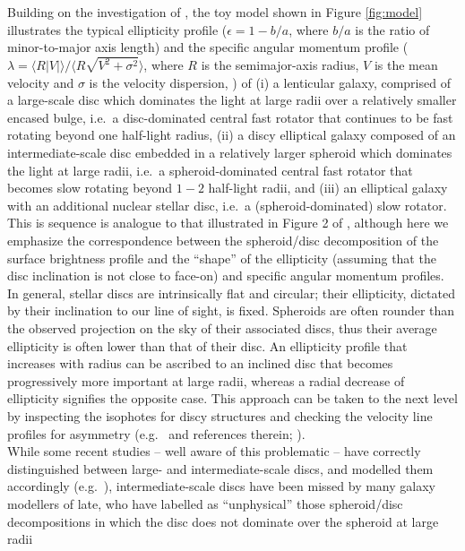 \documentclass[useAMS,usenatbib,article]{mnras}
\begin{document}
{Building on the investigation of \cite{rixwhite1990}, 
the toy model shown in Figure \ref{fig:model} illustrates the typical ellipticity profile 
($\epsilon = 1 - b/a$, where $b/a$ is the ratio of minor-to-major axis length) 
and the specific angular momentum profile 
($\lambda = \langle R |V| \rangle / \langle R \sqrt{V^2 + \sigma^2} \rangle$, 
where $R$ is the semimajor-axis radius, $V$ is the mean velocity and $\sigma$ is the velocity dispersion, \citealt{emsellem2007}) 
of 
(i) a lenticular galaxy, 
comprised of a large-scale disc which dominates the light at large radii over a relatively smaller encased bulge,  
i.e.~a disc-dominated central fast rotator that continues to be fast rotating beyond one half-light radius, 
(ii) a discy elliptical galaxy \citep{kormendybender1996} 
composed of an intermediate-scale disc embedded in a relatively larger spheroid which dominates the light at large radii,
i.e.~a spheroid-dominated central fast rotator that becomes slow rotating beyond $1-2$ half-light radii, and  
(iii) an elliptical galaxy with an additional nuclear stellar disc, 
i.e.~a (spheroid-dominated) slow rotator. 
This is sequence is analogue to that illustrated in Figure 2 of \cite{cappellari2011}, 
although here we emphasize the correspondence between the spheroid/disc decomposition of the surface brightness profile 
and the ``shape'' of the ellipticity (assuming that the disc inclination is not close to face-on) and specific angular momentum profiles. 
In general, stellar discs are intrinsically flat and circular; 
their ellipticity, dictated by their inclination to our line of sight, is fixed. 
Spheroids are often rounder than the observed projection on the sky of their associated discs, 
thus their average ellipticity is often lower than that of their disc. 
An ellipticity profile that increases with radius can be ascribed to an inclined disc that becomes progressively more important at large radii, 
whereas a radial decrease of ellipticity signifies the opposite case. 
This approach can be taken to the next level by inspecting the isophotes for discy structures and checking the velocity line profiles for asymmetry 
(e.g.~\citealt{scorzabender1995} and references therein; \citealt{scorza1998}). \\
While some recent studies -- well aware of this problematic -- have correctly distinguished between large- and intermediate-scale discs, 
and modelled them accordingly (e.g.~\citealt{kormendybender2012,krajnovic2013}), 
intermediate-scale discs have been missed by many galaxy modellers of late, 
who have labelled as ``unphysical'' \citep{allen2006} those spheroid/disc decompositions in which the disc does not dominate over the spheroid at large radii 
}
\end{document}
